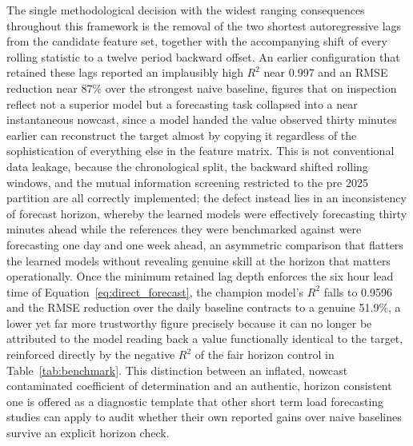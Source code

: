 \documentclass[runningheads]{llncs}
\begin{document}
The single methodological decision with the widest ranging consequences throughout this framework is the removal of the two shortest autoregressive lags from the candidate feature set, together with the accompanying shift of every rolling statistic to a twelve period backward offset. An earlier configuration that retained these lags reported an implausibly high $R^2$ near 0.997 and an RMSE reduction near 87\% over the strongest naive baseline, figures that on inspection reflect not a superior model but a forecasting task collapsed into a near instantaneous nowcast, since a model handed the value observed thirty minutes earlier can reconstruct the target almost by copying it regardless of the sophistication of everything else in the feature matrix. This is not conventional data leakage, because the chronological split, the backward shifted rolling windows, and the mutual information screening restricted to the pre 2025 partition are all correctly implemented; the defect instead lies in an inconsistency of forecast horizon, whereby the learned models were effectively forecasting thirty minutes ahead while the references they were benchmarked against were forecasting one day and one week ahead, an asymmetric comparison that flatters the learned models without revealing genuine skill at the horizon that matters operationally. Once the minimum retained lag depth enforces the six hour lead time of Equation~\ref{eq:direct_forecast}, the champion model's $R^2$ falls to 0.9596 and the RMSE reduction over the daily baseline contracts to a genuine 51.9\%, a lower yet far more trustworthy figure precisely because it can no longer be attributed to the model reading back a value functionally identical to the target, reinforced directly by the negative $R^2$ of the fair horizon control in Table~\ref{tab:benchmark}. This distinction between an inflated, nowcast contaminated coefficient of determination and an authentic, horizon consistent one is offered as a diagnostic template that other short term load forecasting studies can apply to audit whether their own reported gains over naive baselines survive an explicit horizon check.
\end{document}
